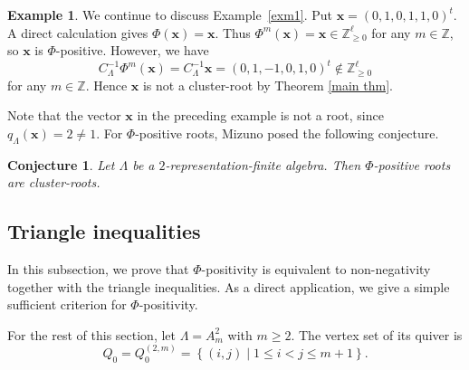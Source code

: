 \documentclass[11pt,a4paper]{amsart}
\newtheorem{conjecture}[theorem]{Conjecture}
\theoremstyle{definition}
\newtheorem{example}[theorem]{Example}
\numberwithin{equation}{section}
\newcommand{\Z}{\mathbb{Z}}
\newcommand{\x}{\mathbf{x}}
\newcommand{\0}{\mathbf{0}}
\begin{document}
	\begin{example} \label{ex:Phi-positive not cluster-root}
	We continue to discuss
	Example~\ref{exm1}. Put 
	$\x=(0,1,0,1,1,0)^t$. 
		A direct calculation gives
		$\Phi(\x)=\x$.	
		Thus $\Phi^m(\x)=\x\in\Z_{\ge 0}^{\ell}$ for any
		$m\in\mathbb Z$, so $\x$ is $\Phi$-positive.
		However, we have
		\[
		C_\Lambda^{-1}\Phi^m(\x)
		=C_\Lambda^{-1}\x=(0,1,-1,0,1,0)^t
		\notin\Z_{\geq0}^{\ell}
		\]
		for any
		$m\in\mathbb Z$. 
		Hence $\x$ is not a cluster-root by Theorem \ref{main thm}.	
	\end{example}
	
	Note that the vector $\x$ in the preceding example is not a root,
	since $q_\Lambda(\x)=2\neq 1$.
	For $\Phi$-positive roots, Mizuno posed the following conjecture.
	
	\begin{conjecture}  \cite[Conjecture 1.6]{Miz} \label{conjecture}
		Let $\Lambda$ be a $2$-representation-finite algebra. Then $\Phi$-positive roots are cluster-roots.
	\end{conjecture}
	

	
	\subsection{Triangle inequalities}
	In this subsection, we prove that $\Phi$-positivity is equivalent to
	non-negativity together with the triangle inequalities. As a direct application, we give a simple sufficient
	criterion for $\Phi$-positivity. 
	
	For the rest of this section, let $\Lambda=A_m^2$ with $m\ge2$.
	The vertex set of its quiver is  \[
	Q_0=Q_0^{(2,m)}=
	\left\{
	(i,j)
	\mid
	1\le i<j \le  m+1
	\right\}. 
	\]
	
\end{document}
